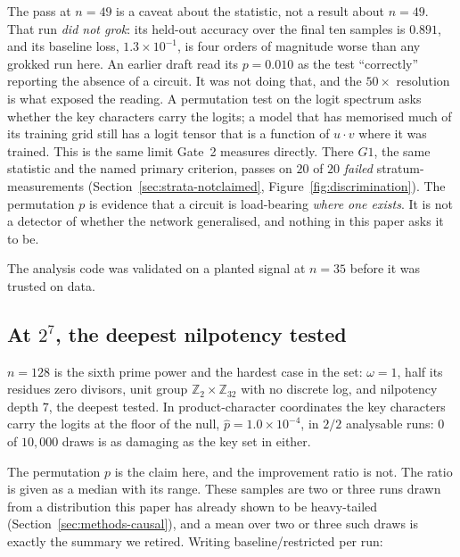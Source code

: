 The pass at $n = 49$ is a caveat about the statistic, not a result about $n = 49$. That run
\emph{did not grok}: its held-out accuracy over the final ten samples is $0.891$, and its baseline loss, $1.3 \times 10^{-1}$, is four orders of magnitude
worse than any grokked run here. An earlier draft read its $p = 0.010$ as the test
``correctly'' reporting the absence of a circuit. It was not doing that, and the $50\times$
resolution is what exposed the reading. A permutation test on the logit spectrum asks whether
the key characters carry the logits; a model that has memorised much of its training grid
still has a logit tensor that is a function of $u \cdot v$ where it was trained. This is the
same limit Gate~2 measures directly. There $G1$, the same statistic and the named primary
criterion, passes on $20$ of $20$ \emph{failed} stratum-measurements
(Section~\ref{sec:strata-notclaimed}, Figure~\ref{fig:discrimination}). The permutation $p$
is evidence that a circuit is load-bearing \emph{where one exists}. It is not a detector of
whether the network generalised, and nothing in this paper asks it to be.

The analysis code was validated on a planted signal at $n = 35$ before it was trusted on
data.

\subsection{At $2^{7}$, the deepest nilpotency tested}
\label{sec:causal-128}

$n = 128$ is the sixth prime power and the hardest case in the set: $\omega = 1$, half its
residues zero divisors, unit group $\mathbb{Z}_{2} \times \mathbb{Z}_{32}$ with no discrete
log, and nilpotency depth $7$, the deepest tested. In product-character coordinates the key
characters carry the logits at the floor of the null, $\hat{p} = 1.0 \times 10^{-4}$, in $2/2$
analysable runs: $0$ of $10{,}000$ draws is as damaging as the key set in either.

The permutation $p$ is the claim here, and the improvement ratio is not. The ratio is given as
a median with its range. These samples are two or three runs drawn from a distribution
this paper has already shown to be heavy-tailed (Section~\ref{sec:methods-causal}), and a mean
over two or three such draws is exactly the summary we retired. Writing
baseline/restricted per run:

